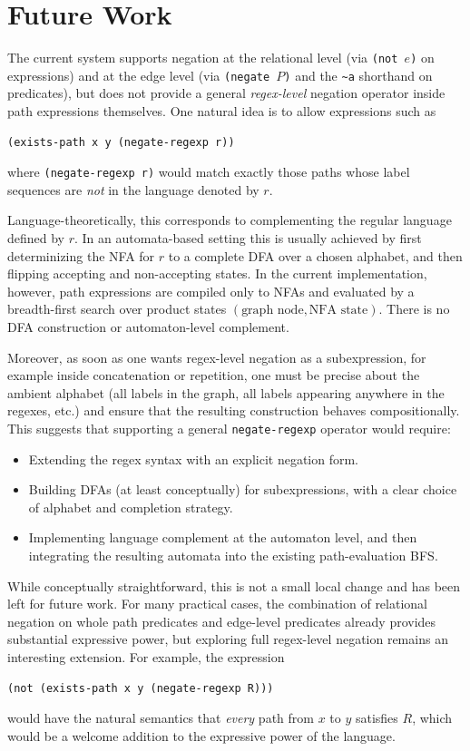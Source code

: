 \documentclass[11pt]{article}
\begin{document}
\section{Future Work}

The current system supports negation at the relational level (via
\texttt{(not $e$)} on expressions) and at the edge level (via
\texttt{(negate $P$)} and the \texttt{\textasciitilde a} shorthand on predicates),
but does not provide a general \emph{regex-level} negation operator
inside path expressions themselves.  One natural idea is to allow
expressions such as
\begin{verbatim}
(exists-path x y (negate-regexp r))
\end{verbatim}
where \texttt{(negate-regexp r)} would match exactly those paths whose
label sequences are \emph{not} in the language denoted by $r$.

Language-theoretically, this corresponds to complementing the regular
language defined by $r$.  In an automata-based setting this is usually
achieved by first determinizing the NFA for $r$ to a complete DFA
over a chosen alphabet, and then flipping accepting and
non-accepting states.  In the current implementation, however, path
expressions are compiled only to NFAs and evaluated by a breadth-first
search over product states $(\text{graph node},\text{NFA state})$.
There is no DFA construction or automaton-level complement.

Moreover, as soon as one wants regex-level negation as a
subexpression, for example inside concatenation or repetition, one
must be precise about the ambient alphabet (all labels in the graph,
all labels appearing anywhere in the regexes, etc.) and ensure that
the resulting construction behaves compositionally.  This suggests
that supporting a general \texttt{negate-regexp} operator would
require:
\begin{itemize}[leftmargin=*]
  \item Extending the regex syntax with an explicit negation form.
  \item Building DFAs (at least conceptually) for subexpressions, with
        a clear choice of alphabet and completion strategy.
  \item Implementing language complement at the automaton level, and
        then integrating the resulting automata into the existing
        path-evaluation BFS.
\end{itemize}
While conceptually straightforward, this is not a small local change
and has been left for future work.  For many practical cases, the
combination of relational negation on whole path predicates and
edge-level predicates already provides substantial expressive power,
but exploring full regex-level negation remains an interesting
extension.  For example, the expression
\begin{verbatim}
(not (exists-path x y (negate-regexp R)))
\end{verbatim}
would have the natural semantics that \emph{every} path from $x$ to
$y$ satisfies $R$, which would be a welcome addition to the
expressive power of the language.
\end{document}

